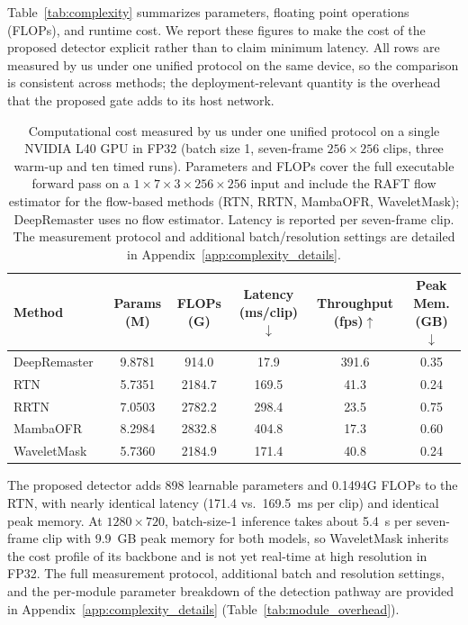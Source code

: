 \documentclass[applsci,article,submit,pdftex,moreauthors]{Definitions/mdpi}
\begin{document}
Table~\ref{tab:complexity} summarizes parameters, floating point operations (FLOPs), and runtime cost. We report these figures to make the cost of the proposed detector explicit rather than to claim minimum latency. All rows are measured by us under one unified protocol on the same device, so the comparison is consistent across methods; the deployment-relevant quantity is the overhead that the proposed gate adds to its host network.

\begin{table}[H]
\caption{Computational cost measured by us under one unified protocol on a single NVIDIA L40 GPU in FP32 (batch size 1, seven-frame $256\times256$ clips, three warm-up and ten timed runs). Parameters and FLOPs cover the full executable forward pass on a $1\times7\times3\times256\times256$ input and include the RAFT flow estimator for the flow-based methods (RTN, RRTN, MambaOFR, WaveletMask); DeepRemaster uses no flow estimator. Latency is reported per seven-frame clip. The measurement protocol and additional batch/resolution settings are detailed in Appendix~\ref{app:complexity_details}.\label{tab:complexity}\label{tab:runtime_benchmark}}
\footnotesize
\begin{tabularx}{\textwidth}{lCCCCC}
\toprule
\textbf{Method} & \textbf{Params (M)} & \textbf{FLOPs (G)} & \textbf{Latency (ms/clip)$\downarrow$} & \textbf{Throughput (fps)$\uparrow$} & \textbf{Peak Mem. (GB)$\downarrow$} \\
\midrule
DeepRemaster~\cite{iizuka2019deepremaster}  & 9.8781 & 914.0  & 17.9  & 391.6 & 0.35 \\
RTN~\cite{rtn2022}                          & 5.7351 & 2184.7 & 169.5 & 41.3  & 0.24 \\
RRTN~\cite{rrtn2024}                        & 7.0503 & 2782.2 & 298.4 & 23.5  & 0.75 \\
MambaOFR~\cite{mao2025mambaofr}             & 8.2984 & 2832.8 & 404.8 & 17.3  & 0.60 \\
\midrule
WaveletMask                                 & 5.7360 & 2184.9 & 171.4 & 40.8  & 0.24 \\
\bottomrule
\end{tabularx}
\normalsize
\end{table}

The proposed detector adds 898 learnable parameters and 0.1494G FLOPs to the RTN, with nearly identical latency (171.4 vs.\ 169.5~ms per clip) and identical peak memory. At $1280\times720$, batch-size-1 inference takes about 5.4~s per seven-frame clip with 9.9~GB peak memory for both models, so WaveletMask inherits the cost profile of its backbone and is not yet real-time at high resolution in FP32. The full measurement protocol, additional batch and resolution settings, and the per-module parameter breakdown of the detection pathway are provided in Appendix~\ref{app:complexity_details} (Table~\ref{tab:module_overhead}).
\end{document}
